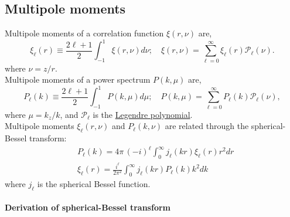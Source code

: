 \documentclass[a4paper,11pt, fleqn]{article}
\begin{document}
\subsection{Multipole moments}

Multipole moments of a correlation function $\xi(r,\nu)$ are,
\begin{equation}
  \xi_\ell(r) \equiv \frac{2 \ell + 1}{2} \int_{-1}^1 \xi(r, \nu) d\nu;\quad
  \xi(r, \nu) = \sum_{\ell=0}^\infty \xi_\ell(r) \mathcal{P}_\ell(\nu).
\end{equation}
where $\nu = z/r$.\\

Multipole moments of a power spectrum $P(k, \mu)$ are,
\begin{equation}
  P_\ell(k) \equiv \frac{2 \ell + 1}{2} \int_{-1}^1 P(k, \mu) d\mu;\quad
  P(k, \mu) = \sum_{\ell=0}^\infty P_\ell(k) \mathcal{P}_\ell(\nu),
\end{equation}
where $\mu = k_z/k$, and $\mathcal{P}_\ell$ is the \hyperref[sec:legendre]{Legendre polynomial}.\\

\vspace{5mm} Multipole moments $\xi_\ell(r, \nu)$ and $P_\ell(k, \nu)$
are related through the spherical-Bessel transform:
%
\begin{align}
  &P_\ell(k) = 4\pi \, (-i)^\ell \!\int_0^\infty \! j_\ell(kr) \xi_\ell(r) r^2 dr
  \label{eq:spherical-bessel-dr}\\
  &\xi_\ell(r) = \frac{i^\ell}{2\pi^2} \int_0^\infty \! j_\ell(kr) P_\ell(k) k^2 dk
  \label{eq:spherical-bessel-dk}
\end{align}
%
where $j_\ell$ is the spherical Bessel function.

\clearpage

\paragraph{Derivation of spherical-Bessel transform} \quad\\
\label{proof:multipole-transform}

\vspace{5mm}
\end{document}
